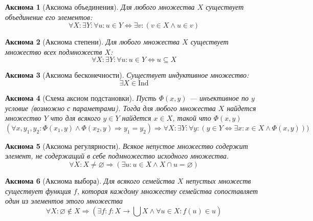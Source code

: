 \documentclass{article}
\newtheorem{axiom}{Аксиома}
\newcommand{\InductiveClass}{\mathrm{Ind}}
\begin{document}
    \begin{axiom}[Аксиома объединения]
        Для любого множества \(X\) существует объединение его элементов:
        \begin{equation}
            \label{ZFC-Union}
            \forall X: \exists Y: \forall u: u \in Y \Leftrightarrow \exists v: (v \in X \land u \in v) \tag{Union}
        \end{equation}
    \end{axiom}
    \begin{axiom}[Аксиома степени]
        Для любого множества \(X\) существует множество  всех подмножеств \(X\):
        \begin{equation}
            \label{ZFC-Power}
            \forall X: \exists Y: \forall u: u \in Y \Leftrightarrow u \subseteq X \tag{Power}
        \end{equation}
    \end{axiom}
    \begin{axiom}[Аксиома бесконечности]
        Существует индуктивное множество:
        \begin{equation}
            \label{ZFC-Inf}
            \exists X \in \InductiveClass \tag{Inf}
        \end{equation}
    \end{axiom}
    \begin{axiom}[Схема аксиом подстановки]
        Пусть \(\Phi(x,y)\) — инъективное по \(y\) условие (возможно с параметрами). Тогда для любого множества \(X\) найдется множество \(Y\) что для всякого \(y \in Y\) найдется \(x \in X\), такой что \(\Phi(x, y)\)
        \begin{equation}
            \label{ZFC-Repl}
            \left(\forall x, y_1, y_2: \Phi(x_1, y) \land \Phi(x_2, y) \Rightarrow y_1 = y_2 \right) \Rightarrow  \forall X:\exists Y: \forall y: (y \in Y \Leftrightarrow \exists x: x \in X \land \Phi(x, y))) \tag{Repl}
        \end{equation}
    \end{axiom}
    \begin{axiom}[Аксиома регулярности]
        Всякое непустое множество содержит элемент, не содержащий в себе подмножество исходного множества.
        \begin{equation}
            \label{ZFC-Reg}
            \forall X: X \ne \varnothing \Rightarrow (\exists u: u \in X \land X \cap u = \varnothing) \tag{Reg}
        \end{equation}
    \end{axiom}
    \begin{axiom}[Аксиома выбора]
        Для всякого семейства \(X\) непустых множеств существует функция \(f\), которая каждому множеству семейства сопоставляет один из элементов этого множества
        \begin{equation}
            \label{ZFC-Choice}
            \forall X: \varnothing \not\in X \Rightarrow \left(\exists f: f: X \to \bigcup X \land \forall u \in X: f(u) \in u\right) \tag{Choice}
        \end{equation}
    \end{axiom}
\end{document}
